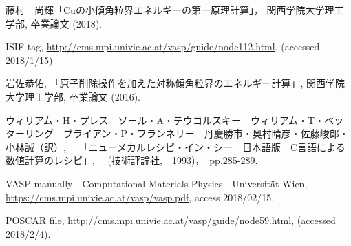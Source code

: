 
\begin{thebibliography}{9}
 藤村　尚輝「Cuの小傾角粒界エネルギーの第一原理計算」， 関西学院大学理工学部, 卒業論文 (2018).


 ISIF-tag, \url{http://cms.mpi.univie.ac.at/vasp/guide/node112.html}, (accessed 2018/1/15)

 岩佐恭佑, 
「原子削除操作を加えた対称傾角粒界のエネルギー計算」, 関西学院大学理工学部, 卒業論文 (2016).

ウィリアム・H・プレス　ソール・A・テウコルスキー　ウィリアム・T・ベッターリング　ブライアン・P・フランネリー　丹慶勝市・奥村晴彦・佐藤峻郎・小林誠（訳）,　
「ニューメカルレシピ・イン・シー　日本語版　C言語による数値計算のレシピ」, 　(技術評論社,　1993)，　pp.285-289.

VASP manually - Computational Materials Physics - Universit\"{a}t Wien, \url{https://cms.mpi.univie.ac.at/vasp/vasp.pdf}, access 2018/02/15.

POSCAR file, \url{http://cms.mpi.univie.ac.at/vasp/guide/node59.html}, (accessed 2018/2/4).


    
    \end{thebibliography}

    
    

